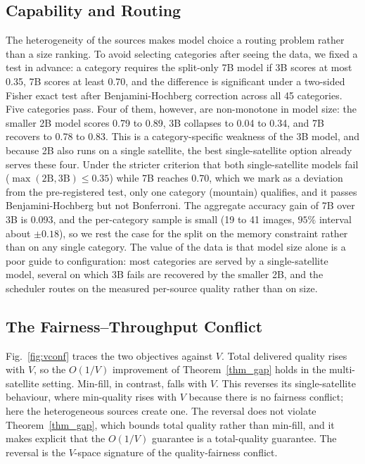 \subsection{Capability and Routing}\label{EV_ROUTE}
The heterogeneity of the sources makes model choice a routing problem rather
than a size ranking. To avoid selecting categories after seeing the data, we
fixed a test in advance: a category requires the split-only 7B model if 3B
scores at most 0.35, 7B scores at least 0.70, and the difference is significant
under a two-sided Fisher exact test after Benjamini-Hochberg correction across
all 45 categories. Five categories pass. Four of them, however, are
non-monotone in model size: the smaller 2B model scores 0.79 to 0.89, 3B
collapses to 0.04 to 0.34, and 7B recovers to 0.78 to 0.83. This is a
category-specific weakness of the 3B model, and because 2B also runs on a
single satellite, the best single-satellite option already serves these four.
Under the stricter criterion that both single-satellite models fail
($\max(\text{2B},\text{3B})\le 0.35$) while 7B reaches 0.70, which we mark as a
deviation from the pre-registered test, only one category (mountain) qualifies,
and it passes Benjamini-Hochberg but not Bonferroni. The aggregate accuracy
gain of 7B over 3B is 0.093, and the per-category sample is small (19 to 41
images, $95\%$ interval about $\pm0.18$), so we rest the case for the split on
the memory constraint rather than on any single category. The value of the data
is that model size alone is a poor guide to configuration: most categories are
served by a single-satellite model, several on which 3B fails are recovered by
the smaller 2B, and the scheduler routes on the measured per-source quality
rather than on size.

\subsection{The Fairness--Throughput Conflict}\label{EV_VCONF}
Fig.~\ref{fig:vconf} traces the two objectives against $V$. Total delivered
quality rises with $V$, so the $O(1/V)$ improvement of Theorem~\ref{thm_gap}
holds in the multi-satellite setting. Min-fill, in contrast, falls with $V$.
This reverses its single-satellite behaviour, where min-quality rises with $V$
because there is no fairness conflict; here the heterogeneous sources create
one. The reversal does not violate Theorem~\ref{thm_gap}, which bounds total
quality rather than min-fill, and it makes explicit that the $O(1/V)$
guarantee is a total-quality guarantee. The reversal is the $V$-space
signature of the quality-fairness conflict.

